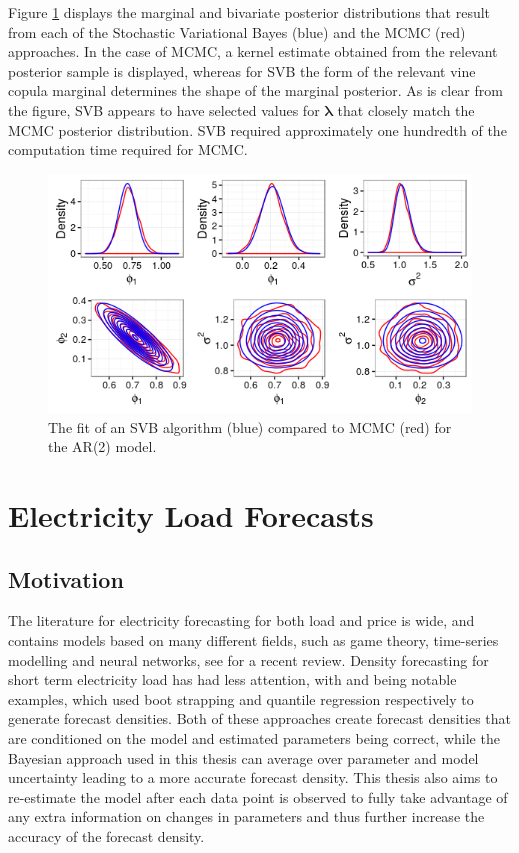 \documentclass[12pt,a4paper]{article}%
\numberwithin{equation}{section}
\begin{document}
Figure \ref{fig:VBfit} displays the marginal and bivariate posterior distributions that result from each of the Stochastic Variational Bayes (blue) and the MCMC (red) approaches. In the case of MCMC, a kernel estimate obtained from the relevant posterior sample is displayed, whereas for SVB the form of the relevant vine copula marginal determines the shape of the marginal posterior. As is clear from the figure, SVB appears to have selected values for $\boldsymbol{\lambda}$ that closely match the MCMC posterior distribution. SVB required approximately one hundredth of the computation time required for MCMC.

\begin{figure}[h]
\centering
\includegraphics[width=0.7\linewidth,height=\textheight,keepaspectratio]{VBfit.png}
\caption{The fit of an SVB algorithm (blue) compared to MCMC (red) for the AR(2) model.}
\label{fig:VBfit}
\end{figure}

\section{Electricity Load Forecasts} \label{sec:ElecLoad}
\subsection{Motivation}

The literature for electricity forecasting for both load and price is wide, and contains models based on many different fields, such as game theory, time-series modelling and neural networks, see \citet{Weron2014} for a recent review. Density forecasting for short term electricity load has had less attention, with \citet{Fan2012} and \citet{He2016} being notable examples, which used boot strapping and quantile regression respectively to generate forecast densities. Both of these approaches create forecast densities that are conditioned on the model and estimated parameters being correct, while the Bayesian approach used in this thesis can average over parameter and model uncertainty leading to a more accurate forecast density. This thesis also aims to re-estimate the model after each data point is observed to fully take advantage of any extra information on changes in parameters and thus further increase the accuracy of the forecast density. 
\end{document}
